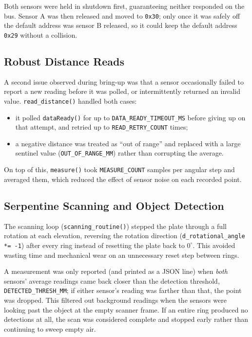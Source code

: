 \documentclass[11pt]{article}
\begin{document}
Both sensors were held in shutdown first, guaranteeing neither responded on
the bus. Sensor A was then released and moved to \texttt{0x30}; only once it
was safely off the default address was sensor B released, so it could keep the
default address \texttt{0x29} without a collision.

\subsection{Robust Distance Reads}

A second issue observed during bring-up was that a sensor occasionally
failed to report a new reading before it was polled, or intermittently
returned an invalid value. \texttt{read\_distance()} handled both cases:
\begin{itemize}
  \item it polled \texttt{dataReady()} for up to
    \texttt{DATA\_READY\_TIMEOUT\_MS} before giving up on that attempt, and
    retried up to \texttt{READ\_RETRY\_COUNT} times;
  \item a negative distance was treated as ``out of range'' and replaced
    with a large sentinel value (\texttt{OUT\_OF\_RANGE\_MM}) rather than
    corrupting the average.
\end{itemize}
On top of this, \texttt{measure()} took \texttt{MEASURE\_COUNT} samples per
angular step and averaged them, which reduced the effect of sensor noise on
each recorded point.

\subsection{Serpentine Scanning and Object Detection}

The scanning loop (\texttt{scanning\_routine()}) stepped the plate through a
full rotation at each elevation, reversing the rotation direction
(\texttt{d\_rotational\_angle *= -1}) after every ring instead of resetting
the plate back to $0^\circ$. This avoided wasting time and mechanical wear
on an unnecessary reset step between rings.

A measurement was only reported (and printed as a JSON line) when
\emph{both} sensors' average readings came back closer than the detection
threshold, \texttt{DETECTED\_THRESH\_MM}; if either sensor's reading was
farther than that, the point was dropped. This filtered out background
readings when the sensors were looking past the object at the empty
scanner frame. If an entire ring produced no detections at all, the scan
was considered complete and stopped early rather than continuing to sweep
empty air.
\end{document}
